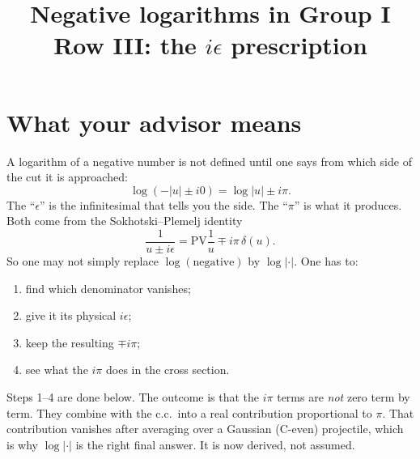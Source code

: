 \documentclass[10pt]{article}
\title{Negative logarithms in Group I Row III: the $i\epsilon$ prescription}
\date{}
\numberwithin{equation}{section}
\newcommand{\PV}{\mathrm{PV}}
\begin{document}
\maketitle

\section{What your advisor means}
A logarithm of a negative number is not defined until one says from which side of the cut it is approached:
\begin{equation}
\log(-|u|\pm i0)=\log|u|\pm i\pi .
\end{equation}
The ``$\epsilon$'' is the infinitesimal that tells you the side. The ``$\pi$'' is what it produces. Both come from the Sokhotski--Plemelj identity
\begin{equation}
\frac{1}{u\pm i\epsilon}=\PV\frac1u\mp i\pi\,\delta(u).\label{eq:SP}
\end{equation}
So one may not simply replace $\log(\text{negative})$ by $\log|\cdot|$. One has to:
\begin{enumerate}
\item find which denominator vanishes;
\item give it its physical $i\epsilon$;
\item keep the resulting $\mp i\pi$;
\item see what the $i\pi$ does in the cross section.
\end{enumerate}
Steps 1--4 are done below. The outcome is that the $i\pi$ terms are \emph{not} zero term by term. They combine with the c.c.\ into a real contribution proportional to $\pi$. That contribution vanishes after averaging over a Gaussian (C-even) projectile, which is why $\log|\cdot|$ is the right final answer. It is now derived, not assumed.
\end{document}
